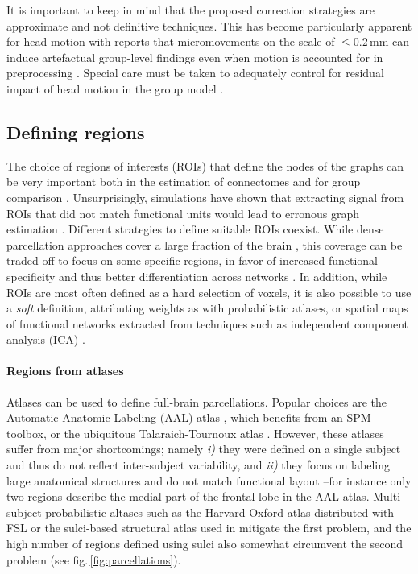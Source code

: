 \documentclass[5p]{elsarticle}
\begin{document}
It is important to keep in mind that the proposed correction strategies
are approximate and not definitive techniques. This has become particularly
apparent for head motion with reports that micromovements on the scale
of $\le 0.2$\,mm can induce artefactual group-level findings even when motion is
accounted for in preprocessing
\cite{vandijk2012,power2011,satterthwaite2013}. Special care must be taken to
adequately control for residual impact of head motion in the group model
\cite{satterthwaite2013,vandijk2012}.

%

\subsection{Defining regions}

The choice of regions of interests (ROIs) that define the nodes of the
graphs can be very important both in the estimation of connectomes and
for group comparison \cite{wang2009}. Unsurprisingly, simulations have
shown that extracting signal from ROIs that did not match functional
units would lead to erronous graph estimation \cite{smith2011}.
%
Different strategies to define suitable ROIs coexist. While dense 
parcellation approaches cover
a large fraction of the brain \cite{achard2006, varoquaux2010c,
wang2009,bellec2006,craddock2012}, this coverage can be traded off to focus on some specific
regions, in favor of increased functional specificity and thus better
differentiation across networks \cite{greicius2003, dosenbach2006,
varoquaux2010b}. In addition, while
ROIs are most often defined as a hard selection of voxels, it is also
possible to use a \emph{soft} definition, attributing weights as with
probabilistic atlases, or spatial maps of functional networks extracted
from techniques such as independent component analysis (ICA) \cite{kiviniemi2009,smith2012}.

\paragraph{Regions from atlases}
%
Atlases can be used to define full-brain parcellations. Popular
choices are the Automatic Anatomic Labeling (AAL) atlas \cite{tzourio-mazoyer2002a}, 
which benefits from an SPM toolbox, or the ubiquitous Talaraich-Tournoux
atlas \cite{talairach1988}. 
However, these atlases suffer from major
shortcomings; namely \emph{i)} they were defined on a single subject
and thus do not reflect inter-subject variability, and \emph{ii)}
they focus on labeling large anatomical structures and do not match
functional layout --for instance only two regions describe the medial
part of the frontal lobe in the AAL atlas. Multi-subject probabilistic altases such as the
Harvard-Oxford atlas distributed with FSL \cite{smith2004} or the
sulci-based structural atlas used in \cite{varoquaux2010c} mitigate the
first problem, and the high number of regions defined using sulci also
somewhat circumvent the second problem (see fig.\,\ref{fig:parcellations}).
\end{document}
